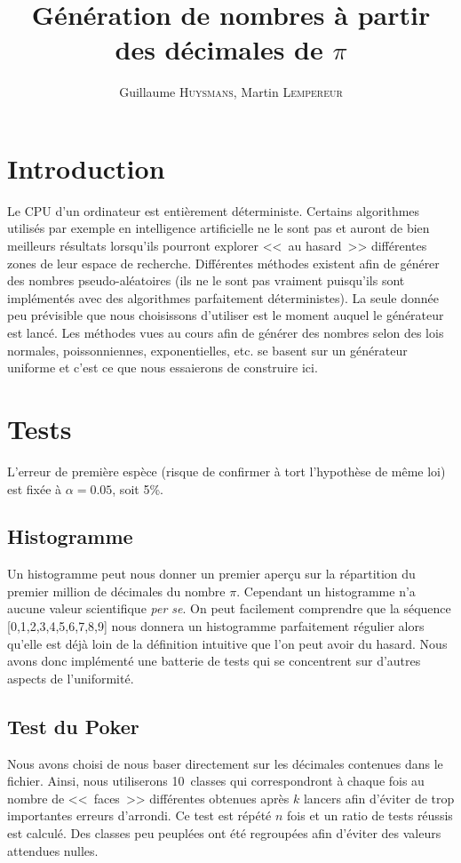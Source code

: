 \documentclass[12pt,a4paper]{article}
\author{Guillaume \textsc{Huysmans}, Martin \textsc{Lempereur}}
\title{Génération de nombres à partir des décimales de $\pi$}
\begin{document}
\maketitle

\section{Introduction}
Le CPU d'un ordinateur est entièrement déterministe. Certains algorithmes
utilisés par exemple en intelligence artificielle ne le sont pas et auront de
bien meilleurs résultats lorsqu'ils pourront explorer <<~au hasard~>> différentes
zones de leur espace de recherche. Différentes méthodes existent afin de générer
des nombres pseudo-aléatoires (ils ne le sont pas vraiment puisqu'ils sont
implémentés avec des algorithmes parfaitement déterministes). La seule donnée
peu prévisible que nous choisissons d'utiliser est le moment auquel le générateur
est lancé.
Les méthodes vues au cours afin de générer des nombres selon des lois normales,
poissonniennes, exponentielles, etc. se basent sur un générateur uniforme et
c'est ce que nous essaierons de construire ici. 

\section{Tests}
L'erreur de première espèce (risque de confirmer à tort l'hypothèse de même loi)
est fixée à $\alpha=0.05$, soit 5\%.

\subsection{Histogramme}
Un histogramme peut nous donner un premier aperçu sur la répartition
du premier million de décimales du nombre $\pi$.
Cependant un histogramme n'a aucune valeur scientifique \textit{per se}. 
On peut facilement comprendre que la séquence [0,1,2,3,4,5,6,7,8,9]
nous donnera un histogramme parfaitement régulier alors qu'elle est déjà loin
de la définition intuitive que l'on peut avoir du hasard.
Nous avons donc implémenté une batterie de tests qui se concentrent sur d'autres aspects de l'uniformité.

\subsection{Test du Poker}
Nous avons choisi de nous baser directement sur les décimales contenues
dans le fichier. Ainsi, nous utiliserons 10~classes qui correspondront
à chaque fois au nombre de <<~faces~>> différentes obtenues
après $k$ lancers afin d'éviter de trop importantes erreurs d'arrondi.
Ce test est répété $n$ fois et un ratio de tests réussis est calculé.
Des classes peu peuplées ont été regroupées afin d'éviter
des valeurs attendues nulles.
\end{document}
